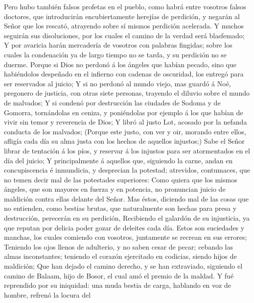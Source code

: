  Pero hubo también falsos profetas en el pueblo, como habrá
entre vosotros falsos doctores, que introducirán encubiertamente
herejías de perdición, y negarán al Señor que los rescató, atrayendo
sobre sí mismos perdición acelerada.  Y muchos seguirán sus
disoluciones, por los cuales el camino de la verdad será blasfemado;
 Y por avaricia harán mercadería de vosotros con palabras
fingidas; sobre los cuales la condenación ya de largo tiempo no se
tarda, y su perdición no se duerme.  Porque si Dios no
perdonó á los ángeles que habían pecado, sino que habiéndolos despeñado
en el infierno con cadenas de oscuridad, los entregó para ser reservados
al juicio;  Y si no perdonó al mundo viejo, mas guardó á
Noé, pregonero de justicia, con otras siete personas, trayendo el
diluvio sobre el mundo de malvados;  Y si condenó por
destrucción las ciudades de Sodoma y de Gomorra, tornándolas en ceniza,
y poniéndolas por ejemplo á los que habían de vivir sin temor y
reverencia de Dios;  Y libró al justo Lot, acosado por la
nefanda conducta de los malvados;  (Porque este justo, con
ver y oir, morando entre ellos, afligía cada día su alma justa con los
hechos de aquellos injustos;)  Sabe el Señor librar de
tentación á los píos, y reservar á los injustos para ser atormentados en
el día del juicio;  Y principalmente á aquellos que,
siguiendo la carne, andan en concupiscencia é inmundicia, y desprecian
la potestad; atrevidos, contumaces, que no temen decir mal de las
potestades superiores:  Como quiera que los mismos ángeles,
que son mayores en fuerza y en potencia, no pronuncian juicio de
maldición contra ellas delante del Señor.  Mas éstos,
diciendo mal de las cosas que no entienden, como bestias brutas, que
naturalmente son hechas para presa y destrucción, perecerán en su
perdición,  Recibiendo el galardón de su injusticia, ya que
reputan por delicia poder gozar de deleites cada día. Estos son
suciedades y manchas, los cuales comiendo con vosotros, juntamente se
recrean en sus errores;  Teniendo los ojos llenos de
adulterio, y no saben cesar de pecar; cebando las almas inconstantes;
teniendo el corazón ejercitado en codicias, siendo hijos de maldición;
 Que han dejado el camino derecho, y se han extraviado,
siguiendo el camino de Balaam, hijo de Bosor, el cual amó el premio de
la maldad.  Y fué reprendido por su iniquidad: una muda
bestia de carga, hablando en voz de hombre, refrenó la locura del
